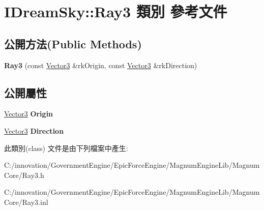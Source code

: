 \hypertarget{class_i_dream_sky_1_1_ray3}{}\section{I\+Dream\+Sky\+:\+:Ray3 類別 參考文件}
\label{class_i_dream_sky_1_1_ray3}
\subsection*{公開方法(Public Methods)}
\begin{DoxyCompactItemize}
\item 
{\bfseries Ray3} (const \hyperlink{class_i_dream_sky_1_1_vector3}{Vector3} \&rk\+Origin, const \hyperlink{class_i_dream_sky_1_1_vector3}{Vector3} \&rk\+Direction)\hypertarget{class_i_dream_sky_1_1_ray3_a6b85ec094a103857f5a32100f3256710}{}\label{class_i_dream_sky_1_1_ray3_a6b85ec094a103857f5a32100f3256710}

\end{DoxyCompactItemize}
\subsection*{公開屬性}
\begin{DoxyCompactItemize}
\item 
\hyperlink{class_i_dream_sky_1_1_vector3}{Vector3} {\bfseries Origin}\hypertarget{class_i_dream_sky_1_1_ray3_ae65e59ab092c4dfb438f13b9e94a3d70}{}\label{class_i_dream_sky_1_1_ray3_ae65e59ab092c4dfb438f13b9e94a3d70}

\item 
\hyperlink{class_i_dream_sky_1_1_vector3}{Vector3} {\bfseries Direction}\hypertarget{class_i_dream_sky_1_1_ray3_a3cbb538a92354e9a39a2b54efea94877}{}\label{class_i_dream_sky_1_1_ray3_a3cbb538a92354e9a39a2b54efea94877}

\end{DoxyCompactItemize}


此類別(class) 文件是由下列檔案中產生\+:\begin{DoxyCompactItemize}
\item 
C\+:/innovation/\+Government\+Engine/\+Epic\+Force\+Engine/\+Magnum\+Engine\+Lib/\+Magnum\+Core/Ray3.\+h\item 
C\+:/innovation/\+Government\+Engine/\+Epic\+Force\+Engine/\+Magnum\+Engine\+Lib/\+Magnum\+Core/Ray3.\+inl\end{DoxyCompactItemize}
